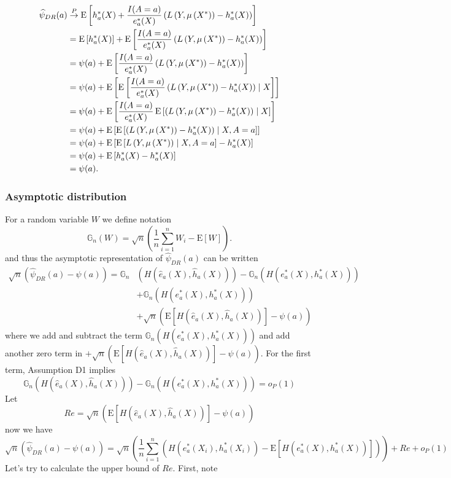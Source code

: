 $$
\begin{aligned}
\widehat{\psi}_{DR}(a) & \stackrel{P}{\rightarrow}  \operatorname{E}\left[h^*_a(X)+\frac{I(A = a)}{e^*_a(X)}\left(L\left(Y, \mu\left(X^*\right)\right)-h^*_a(X)\right)\right] \\
&= \operatorname{E}\left[h^*_a(X)\right]+\operatorname{E}\left[\frac{I(A = a)}{e^*_a(X)}\left(L\left(Y, \mu\left(X^*\right)\right)-h^*_a(X)\right)\right] \\
& =\psi(a)+\operatorname{E}\left[\frac{I(A = a)}{e^*_a(X)}\left(L\left(Y, \mu\left(X^*\right)\right)-h^*_a(X)\right)\right] \\
& =\psi(a)+\operatorname{E}\left[\operatorname{E}\left[\frac{I(A = a)}{e^*_a(X)}\left(L\left(Y, \mu\left(X^*\right)\right)-h^*_a(X)\right) \mid X \right]\right] \\
& =\psi(a)+\operatorname{E}\left[\frac{I(A = a)}{e^*_a(X)} \operatorname{E}\left[\left(L\left(Y, \mu\left(X^*\right)\right)-h^*_a(X)\right) \mid X \right]\right] \\
& =\psi(a)+\operatorname{E}\left[\operatorname{E}\left[\left(L\left(Y, \mu\left(X^*\right)\right)-h^*_a(X)\right) \mid X, A=a \right]\right] \\
& =\psi(a)+\operatorname{E}\left[\operatorname{E}\left[L\left(Y, \mu\left(X^*\right)\right) \mid X, A=a  \right] -h^*_a(X) \right] \\
& =\psi(a)+\operatorname{E}\left[h^*_a(X) -h^*_a(X) \right] \\
& =\psi(a) .
\end{aligned}
$$

\subsubsection{Asymptotic distribution}

For a random variable $W$ we define notation
$$
\mathbb{G}_n(W)=\sqrt{n}\left(\frac{1}{n} \sum_{i=1}^n W_i-\mathrm{E}[W]\right) .
$$
and thus the asymptotic representation of $\widehat{\psi}_{DR}(a)$ can be written
$$
\begin{aligned}
\sqrt{n}\left(\widehat{\psi}_{DR}(a)-\psi(a)\right)=\mathbb{G}_n &(H(\widehat{e}_a(X), \widehat{h}_a(X)))-\mathbb{G}_n\left(H\left(e^*_a(X), h^*_a(X)\right)\right) \\
& +\mathbb{G}_n\left(H\left(e^*_a(X), h^*_a(X)\right)\right) \\
& +\sqrt{n}(\mathrm{E}[H(\widehat{e}_a(X), \widehat{h}_a(X))]-\psi(a))
\end{aligned}
$$
where we add and subtract the term $\mathbb{G}_n\left(H\left(e^*_a(X), h^*_a(X)\right)\right)$ and add another zero term in $+\sqrt{n}(\mathrm{E}[H(\widehat{e}_a(X), \widehat{h}_a(X))]-\psi(a))$. For the first term, Assumption D1 implies
$$
\mathbb{G}_n(H(\widehat{e}_a(X), \widehat{h}_a(X)))-\mathbb{G}_n\left(H\left(e^*_a(X), h^*_a(X)\right)\right)=o_P(1)
$$
Let 
$$
Re=\sqrt{n}(\mathrm{E}[H(\widehat{e}_a(X), \widehat{h}_a(X))]-\psi(a))
$$
now we have
$$
\sqrt{n}\left(\widehat{\psi}_{DR}(a)-\psi(a)\right)=\sqrt{n}\left(\frac{1}{n} \sum_{i=1}^n\left(H\left(e^*_a(X_i), h^*_a(X_i)\right)-\mathrm{E}\left[H\left(e^*_a(X), h^*_a(X)\right)\right]\right)\right)+R e+o_P(1)
$$
Let's try to calculate the upper bound of $Re$. First, note

